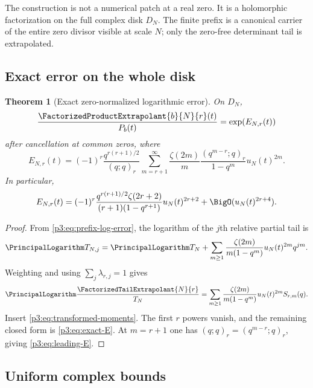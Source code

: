 \documentclass[11pt]{article}
\numberwithin{equation}{section}
\newtheorem{theorem}{Theorem}[section]
\theoremstyle{definition}
\theoremstyle{remark}
\begin{document}
\begin{remark}
The construction is not a numerical patch at a real zero.  It is a holomorphic factorization
on the full complex disk $D_N$.  The finite prefix is a canonical carrier of the entire zero
divisor visible at scale $N$; only the zero-free determinant tail is extrapolated.
\end{remark}

\subsection{Exact error on the whole disk}

\begin{theorem}[Exact zero-normalized logarithmic error]\label{p3:thm:exact-error}
On $D_N$,
\begin{equation}
 \frac{\FactorizedProductExtrapolant{b}{N}{r}(t)}{P_b(t)}
 =\exp(E_{N,r}(t))
 \label{p3:eq:quotient-error}
\end{equation}
after cancellation at common zeros, where
\begin{equation}
 \boxed{
 E_{N,r}(t)=(-1)^r\frac{q^{r(r+1)/2}}{(q;q)_r}
 \sum_{m=r+1}^{\infty}\frac{\zeta(2m)}{m}
 \frac{(q^{m-r};q)_r}{1-q^m}
 u_N(t)^{2m}.}
 \label{p3:eq:exact-E}
\end{equation}
In particular,
\begin{equation}
 E_{N,r}(t)
 =(-1)^r\frac{q^{r(r+1)/2}\zeta(2r+2)}
 {(r+1)(1-q^{r+1})}u_N(t)^{2r+2}
 +\BigO(u_N(t)^{2r+4}).
 \label{p3:eq:leading-E}
\end{equation}
\end{theorem}

\begin{proof}
From \eqref{p3:eq:prefix-log-error}, the logarithm of the $j$th relative partial tail is
\[
 \PrincipalLogarithm T_{N,j}
 =\PrincipalLogarithm T_N+
 \sum_{m\ge1}\frac{\zeta(2m)}{m(1-q^m)}u_N(t)^{2m}q^{jm}.
\]
Weighting and using $\sum_j\lambda_{r,j}=1$ gives
\[
 \PrincipalLogarithm\frac{\FactorizedTailExtrapolant{N}{r}}{T_N}
 =\sum_{m\ge1}\frac{\zeta(2m)}{m(1-q^m)}u_N(t)^{2m}S_{r,m}(q).
\]
Insert \eqref{p3:eq:transformed-moments}.  The first $r$ powers vanish, and the remaining
closed form is \eqref{p3:eq:exact-E}.  At $m=r+1$ one has
$(q;q)_r=(q^{m-r};q)_r$, giving \eqref{p3:eq:leading-E}.
\end{proof}

\subsection{Uniform complex bounds}
\end{document}

